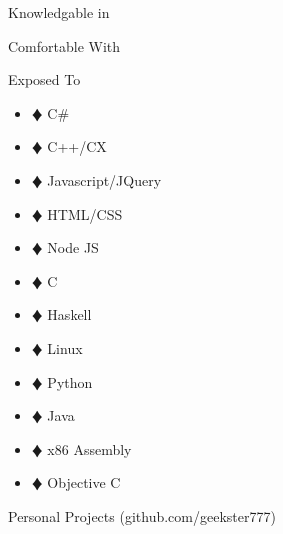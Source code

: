 \documentclass{article}
\newcommand{\lineseparator}[1]{\noindent\makebox[\linewidth]{\rule{\textwidth}{#1}}}
\begin{document}
\begin{minipage}[t]{0.33\textwidth}
  {\Large Knowledgable in }\\ 
\end{minipage}
\begin{minipage}[t]{0.33\textwidth}
  {\Large Comfortable With }\\ 
\end{minipage}
\begin{minipage}[t]{0.34\textwidth}
  {\Large Exposed To }\\ 
\end{minipage}
\lineseparator{0.5pt}
\vspace{3mm}
\begin{minipage}[t]{0.33\textwidth}
  \vspace{0.5mm}
  \begin {itemize}
    \item[$\vardiamond$] C\# 
    \item[$\vardiamond$] C++/CX 
    \item[$\vardiamond$] Javascript/JQuery 
    \item[$\vardiamond$] HTML/CSS 
  \end{itemize}
\end{minipage}
\begin{minipage}[t]{0.33\textwidth}
  \vspace{0.5mm}
  \begin {itemize}
    \item[$\vardiamond$] Node JS 
    \item[$\vardiamond$] C 
    \item[$\vardiamond$] Haskell 
    \item[$\vardiamond$] Linux
  \end{itemize}
\end{minipage}
\begin{minipage}[t]{0.34\textwidth}
  \vspace{0.5mm}
  \begin {itemize}
    \item[$\vardiamond$] Python 
    \item[$\vardiamond$] Java 
    \item[$\vardiamond$] x86 Assembly 
    \item[$\vardiamond$] Objective C 
  \end{itemize}
\end{minipage}
{\Large Personal Projects (github.com/geekster777) } \\ 
\lineseparator{0.5pt}
\vspace{1mm}
\end{document}
